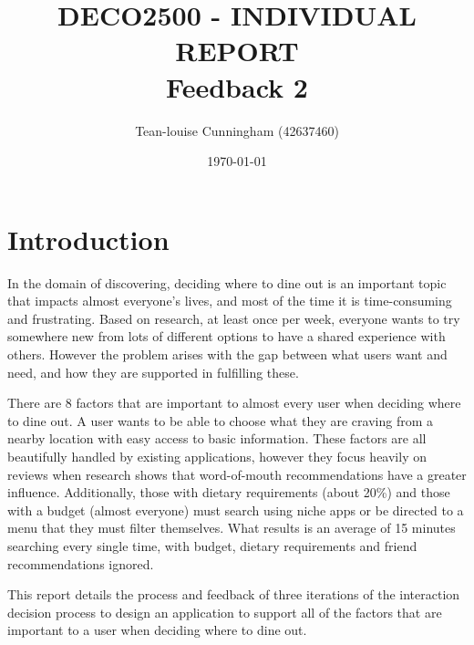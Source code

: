 \documentclass[a4 paper, 12pt]{article}
\title{DECO2500 - INDIVIDUAL REPORT \\ Feedback 2}
\author{Tean-louise Cunningham (42637460)}
\date{\today}
\begin{document}
\maketitle

\pagebreak
\tableofcontents

\pagebreak
\section{Introduction}
In the domain of discovering, deciding where to dine out is an important topic that impacts almost everyone’s lives, and most of the time it is time-consuming and frustrating. Based on research, at least once per week, everyone wants to try somewhere new from lots of different options to have a shared experience with others. However the problem arises with the gap between what users want and need, and how they are supported in fulfilling these. 

There are 8 factors that are important to almost every user when deciding where to dine out. A user wants to be able to choose what they are craving from a nearby location with easy access to basic information. These factors are all beautifully handled by existing applications, however they focus heavily on reviews when research shows that word-of-mouth recommendations have a greater influence. Additionally, those with dietary requirements (about 20\%) and those with a budget (almost everyone) must search using niche apps or be directed to a menu that they must filter themselves. What results is an average of 15 minutes searching every single time, with budget, dietary requirements and friend recommendations ignored.

This report details the process and feedback of three iterations of the interaction decision process to design an application to support all of the factors that are important to a user when deciding where to dine out. 

\pagebreak


\pagebreak

\pagebreak

\end{document}
